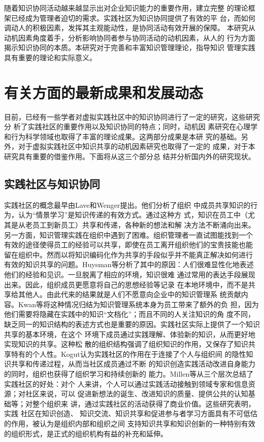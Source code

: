 \documentclass[12pt,a4paper,cs4size]{ctexart}
\begin{document}
随着知识协同活动越来越显示出对企业知识能力的重要作用，建立完整
的理论框架已经成为管理者迫切的需求。实践社区为知识协同提供了有效的平
台，而如何调动人的积极因素，发挥其主观能动性，是协同活动有效开展的保障。
本研究从动机因素角度着手，分析影响协同者参与协同活动的动机因素，从人的
行为方面揭示知识协同的本质。本研究对于完善和丰富知识管理理论，指导知识
管理实践具有重要的理论和实际意义。







\section{有关方面的最新成果和发展动态}
目前，已经有一些学者对虚拟实践社区中的知识协同进行了一定的研究，这些研究分
析了实践社区的重要作用以及知识协同的特点；同时，动机因
素研究在心理学和行为科学领域也取得了丰富的理论成果。这两部分成果是本研
究的基础。另外，对于虚拟实践社区中知识共享的动机因素研究也取得了一定的
成果，对于本研究具有重要的借鉴作用。下面将从这三个部分总
结并分析国内外的研究现状。



\subsection{实践社区与知识协同}


实践社区的概念最早由Lave和Wenger提出\cite{lave1991sll}。他们分析了组织
中成员共享知识的行为，认为“情景学习”是知识传递的有效方式。通过这种方
式，知识在员工中（尤其是从老员工到新员工）共享和传递，各种新的想法和解
决方法不断涌向出来。另一方面，知识管理实践在组织中遇到了困难。组织管理者一直试图能找到一个
有效的途径使得员工的经验可以共享，即使在员工离开组织他们的宝贵技能也能
留在组织中。然而以将知识编码化作为共享的手段似乎并不能真正解决如何进行
有效的知识共享的问题。Huysman等分析了其中的原因：人们很难显性化地表述
他们的经验和见识\cite{huysman2002ksp}。一旦脱离了相应的环境，知识很难
通过常用的表达手段展现出来。因此，组织成员更愿意将自己的思想经验等记录
在本地环境中，而不是共享给其他人。由此代来的结果就是人们不愿意向企业中的知识管理系
统贡献内容。Kwan等将这种情况归结为知识管理系统本身为员工带来了额外的负
担，因为他们需要将隐藏在实践中的知识“文档化”；而且不同的人关注知识的角
度不同，缺乏同一的知识结构的表述方式也是重要的原因\cite{MillieKwan2003}。实践社区实际上提供了一个知识共享的基本环境，在这个
环境下成员通过实践理解、体验新的知识，从而更好地实现知识的共享。这种松
散的组织结构强调了组织知识的作用，又保存了知识共享特有的个人性。Kogut认为实践社区的作用在于连接了个人与组织间
的隐性知识共享和传递过程\cite{443473219920801}，从而当社区成员通过不断
的知识创造实践活动改进自身能力的同时，组织也获得了组织学习和持续创新的
能力\cite{wenger1999cpl}。Millen等从三个层次总结了实践社区的好处：对个
人来讲，个人可以通过实践活动接触到领域专家和信息资源；对社区来说，可以
促进新想法的诞生、改进知识的质量、提供公共的认知基础等；对整个组织来
讲，通过实践社区的活动获得了商业价值\cite{millen2002uba}。这些研究表明，实践
社区在知识创造、
知识交流、知识共享和促进参与者学习方面具有不可低估的作用，被认为是组织内部和组织之间
支持知识共享和知识创新的一种特别有效的组织形式，是正式的组织机构有益的补充和延伸。
\end{document}
